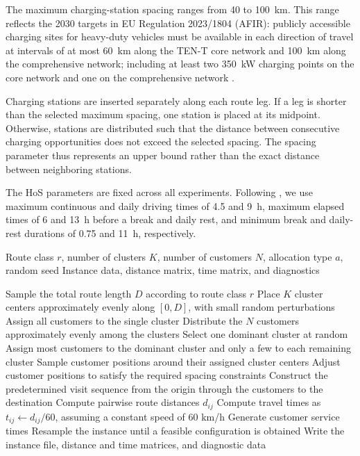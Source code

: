 \documentclass[3p,11pt,authoryear]{elsarticle}  %
\begin{document}
The maximum charging-station spacing ranges from 40 to 100~km. This range reflects the 2030 targets in EU Regulation 2023/1804 (AFIR): publicly accessible charging sites for heavy-duty vehicles must be available in each direction of travel at intervals of at most 60~km along the TEN-T core network and 100~km along the comprehensive network; including at least two 350~kW charging points on the core network and one on the comprehensive network \citep{eu2023afir}.

Charging stations are inserted separately along each route leg. If a leg is shorter than the selected maximum spacing, one station is placed at its midpoint. Otherwise, stations are distributed such that the distance between consecutive charging opportunities does not exceed the selected spacing. The spacing parameter thus represents an upper bound rather than the exact distance between neighboring stations.

The HoS parameters are fixed across all experiments. Following \citet{goel2017exact}, we use maximum continuous and daily driving times of 4.5 and 9~h, maximum elapsed times of 6 and 13~h before a break and daily rest, and minimum break and daily-rest durations of 0.75 and 11~h, respectively. 



\begin{algorithm}[t]
\caption{Benchmark instance generation}
\label{alg:instance-generator}
\begin{algorithmic}[1]
\color{red}
\Require Route class $r$, number of clusters $K$, number of customers $N$,
         allocation type $a$, random seed
\Ensure Instance data, distance matrix, time matrix, and diagnostics

\State Sample the total route length $D$ according to route class $r$
\State Place $K$ cluster centers approximately evenly along $[0,D]$,
       with small random perturbations
    \State Assign all customers to the single cluster
    \State Distribute the $N$ customers approximately evenly among the clusters
\Else
    \State Select one dominant cluster at random
    \State Assign most customers to the dominant cluster and only a few to each remaining cluster
\EndIf
\State Sample customer positions around their assigned cluster centers
\State Adjust customer positions to satisfy the required spacing constraints
\State Construct the predetermined visit sequence from the origin through the customers to the destination
\State Compute pairwise route distances $d_{ij}$
\State Compute travel times as $t_{ij} \gets d_{ij}/60$, assuming a constant speed of $60$ km/h
\State Generate customer service times %
    \State Resample the instance until a feasible configuration is obtained
\EndIf
\State Write the instance file, distance and time matrices, and diagnostic data
\end{algorithmic}
\end{algorithm}
\end{document}
